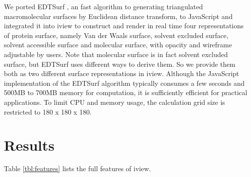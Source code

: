 We ported EDTSurf \citep{1297,1350}, an fast algorithm to generating triangulated macromolecular surfaces by Euclidean distance transform, to JavaScript and integrated it into iview to construct and render in real time four representations of protein surface, namely Van der Waals surface, solvent excluded surface, solvent accessible surface and molecular surface, with opacity and wireframe adjustable by users. Note that molecular surface is in fact solvent excluded surface, but EDTSurf uses different ways to derive them. So we provide them both as two different surface representations in iview. Although the JavaScript implementation of the EDTSurf algorithm typically consumes a few seconds and 500MB to 700MB memory for computation, it is sufficiently efficient for practical applications. To limit CPU and memory usage, the calculation grid size is restricted to 180 x 180 x 180.

\section{Results}

Table \ref{tbl:features} lists the full features of iview.

